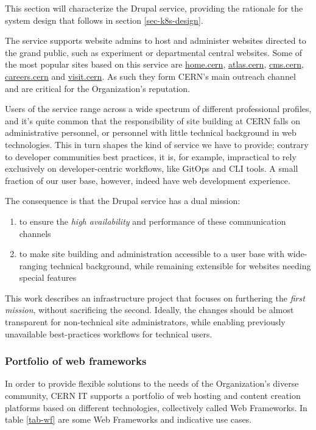 This section will characterize the Drupal service, providing the rationale for the system design that follows in section \ref{sec-k8s-design}.

The service supports website admins to host and administer websites directed to the grand public,
such as experiment or departmental central websites.
Some of the most popular sites based on this service are \href{https://home.cern/}{home.cern}, \href{https://atlas.cern}{atlas.cern},
\href{https://cms.cern}{cms.cern}, \href{https://careers.cern}{careers.cern} and \href{https://visit.cern}{visit.cern}.
As such they form CERN's main outreach channel and are critical for the Organization's reputation.

Users of the service range across a wide spectrum of different professional profiles,
and it's quite common that the responsibility of site building at CERN falls on administrative personnel, or personnel with little technical background in web technologies.
This in turn shapes the kind of service we have to provide; contrary to developer communities best practices, it is, for example, impractical to rely exclusively on developer-centric workflows, like GitOps and CLI tools.
A small fraction of our user base, however, indeed have web development experience.


The consequence is that the Drupal service has a dual mission:
\begin{enumerate}
    \item to ensure the \emph{high availability} and performance of these communication channels
    \item to make site building and administration accessible to a user base with wide-ranging technical background, while remaining extensible for websites needing special features
\end{enumerate}

This work describes an infrastructure project that focuses on furthering the \emph{first mission}, without sacrificing the second.
Ideally, the changes should be almost transparent for non-technical site administrators, while enabling previously unavailable best-practices workflows for technical users.

\subsubsection*{Portfolio of web frameworks}

In order to provide flexible solutions to the needs of the Organization's diverse community, CERN IT supports a portfolio of web hosting and content creation platforms based on different technologies, collectively called Web Frameworks.
In table \ref{tab-wf} are some Web Frameworks and indicative use cases.

